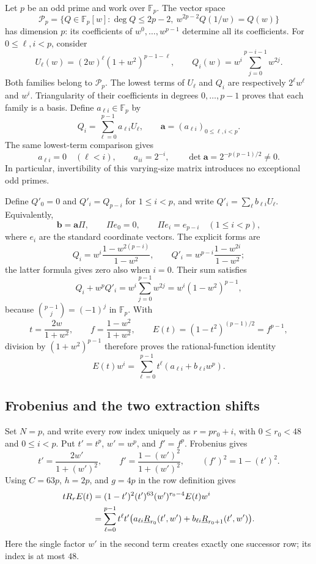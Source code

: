 Let $p$ be an odd prime and work over $\mathbb F_p$. The vector space
\[
 \mathcal P_p=\{Q\in\mathbb F_p[w]:\deg Q\le2p-2,
                \ w^{2p-2}Q(1/w)=Q(w)\}
\]
has dimension $p$: its coefficients of $w^0,\ldots,w^{p-1}$ determine
all its coefficients. For $0\le\ell,i<p$, consider
\[
 U_\ell(w)=(2w)^\ell(1+w^2)^{p-1-\ell},\qquad
 Q_i(w)=w^i\sum_{j=0}^{p-i-1}w^{2j}.
\]
Both families belong to $\mathcal P_p$. The lowest terms of $U_\ell$
and $Q_i$ are respectively $2^\ell w^\ell$ and $w^i$. Triangularity
of their coefficients in degrees $0,\ldots,p-1$ proves that each family
is a basis. Define $a_{\ell i}\in\mathbb F_p$ by
\[
 Q_i=\sum_{\ell=0}^{p-1}a_{\ell i}U_\ell,
 \qquad \mathbf a=(a_{\ell i})_{0\le\ell,i<p}.
\]
The same lowest-term comparison gives
\begin{equation}\label{eq:nonvanishing-triangular-unit}
 a_{\ell i}=0\quad(\ell<i),\qquad a_{ii}=2^{-i},\qquad
 \det\mathbf a=2^{-p(p-1)/2}\ne0.
\end{equation}
In particular, invertibility of this varying-size matrix introduces no
exceptional odd primes.

Define $Q'_0=0$ and $Q'_i=Q_{p-i}$ for $1\le i<p$, and write
$Q'_i=\sum_\ell b_{\ell i}U_\ell$. Equivalently,
\begin{equation}\label{eq:nonvanishing-transition}
 \mathbf b=\mathbf a\Pi,\qquad
 \Pi e_0=0,\qquad \Pi e_i=e_{p-i}\quad(1\le i<p),
\end{equation}
where $e_i$ are the standard coordinate vectors. The explicit forms are
\[
 Q_i=w^i\frac{1-w^{2(p-i)}}{1-w^2},\qquad
 Q'_i=w^{p-i}\frac{1-w^{2i}}{1-w^2};
\]
the latter formula gives zero also when $i=0$. Their sum satisfies
\[
 Q_i+w^pQ'_i
 =w^i\sum_{j=0}^{p-1}w^{2j}
 =w^i(1-w^2)^{p-1},
\]
because $\binom{p-1}{j}=(-1)^j$ in $\mathbb F_p$. With
\[
 t=\frac{2w}{1+w^2},\qquad f=\frac{1-w^2}{1+w^2},\qquad
 E(t)=(1-t^2)^{(p-1)/2}=f^{p-1},
\]
division by $(1+w^2)^{p-1}$ therefore proves the rational-function identity
\begin{equation}\label{eq:nonvanishing-palindromic-expansion}
 E(t)w^i=\sum_{\ell=0}^{p-1}t^\ell
              (a_{\ell i}+b_{\ell i}w^p).
\end{equation}

\subsection{Frobenius and the two extraction shifts}

Set $N=p$, and write every row index uniquely as
$r=pr_0+i$, with $0\le r_0<48$ and $0\le i<p$. Put
$t'=t^p$, $w'=w^p$, and $f'=f^p$. Frobenius gives
\[
 t'=\frac{2w'}{1+(w')^2},\qquad
 f'=\frac{1-(w')^2}{1+(w')^2},\qquad (f')^2=1-(t')^2.
\]
Using $C=63p$, $h=2p$, and $g=4p$ in the row definition gives
\begin{align}
 tR_rE(t)
 &= (1-t')^2(t')^{63}(w')^{r_0-4}E(t)w^i\notag\\
 &=\sum_{\ell=0}^{p-1}t^\ell t'
       \bigl(a_{\ell i}\underline R_{r_0}(t',w')
            +b_{\ell i}\underline R_{r_0+1}(t',w')\bigr).
 \label{eq:nonvanishing-frobenius-row}
\end{align}
Here the single factor $w'$ in the second term creates exactly one successor
row; its index is at most $48$.

